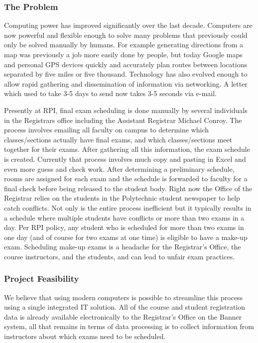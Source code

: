 \documentclass[11pt]{article}
\begin{document}
\subsubsection*{The Problem}
Computing power has improved significantly over the last decade.  Computers are now powerful and flexible enough to solve many problems that previously could only be solved manually by humans.  For example generating directions from a map was previously a job more easily done by people, but today Google maps and personal GPS devices quickly and accurately plan routes between locations separated by five miles or five thousand.  Technology has also evolved enough to allow rapid gathering and dissemination of information via networking.  A letter which used to take 3-5 days to send now takes  3-5 seconds via e-mail.

\par Presently at RPI, final exam scheduling is done manually by several individuals in the Registrars office including the Assistant Registrar Michael Conroy.  The process involves emailing all faculty on campus to determine which classes/sections actually have final exams, and which classes/sections meet together for their exams.  After gathering all this information, the exam schedule is created.  Currently that process involves much copy and pasting in Excel and even more guess and check work.  After determining a preliminary schedule, rooms are assigned for each exam and the schedule is forwarded to faculty for a final check before being released to the student body.  Right now the Office of the Registrar relies on the students in the Polytechnic student newspaper to help catch conflicts.  Not only is the entire process inefficient but it typically results in a schedule where multiple students have conflicts or more than two exams in a day.  Per RPI policy, any student who is scheduled for more than two exams in one day (and of course for two exams at one time) is eligible to have a make-up exam. Scheduling make-up exams is a headache for the Registrar's Office, the course instructors, and the students, and can lead to unfair exam practices.

\subsubsection*{Project Feasibility}
\par We believe that using modern computers is possible to streamline this process using a single integrated IT solution.  All of the course and student registration data is already available electronically to the Registrar's Office on the Banner system, all that remains in terms of data processing is to collect information from instructors about which exams need to be scheduled.
\end{document}
